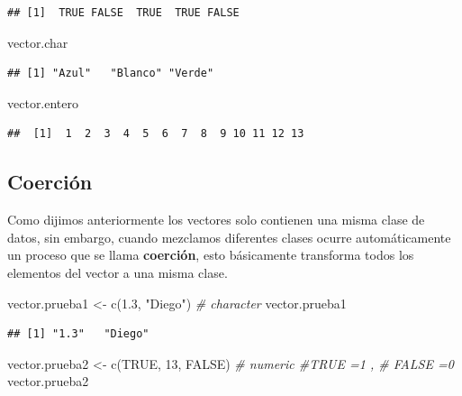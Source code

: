 \documentclass[
  12pt,
]{book}
\newenvironment{Shaded}{\begin{snugshade}}{\end{snugshade}}
\newcommand{\CommentTok}[1]{\textcolor[rgb]{0.56,0.35,0.01}{\textit{#1}}}
\newcommand{\ConstantTok}[1]{\textcolor[rgb]{0.00,0.00,0.00}{#1}}
\newcommand{\DecValTok}[1]{\textcolor[rgb]{0.00,0.00,0.81}{#1}}
\newcommand{\FloatTok}[1]{\textcolor[rgb]{0.00,0.00,0.81}{#1}}
\newcommand{\FunctionTok}[1]{\textcolor[rgb]{0.00,0.00,0.00}{#1}}
\newcommand{\NormalTok}[1]{#1}
\newcommand{\OtherTok}[1]{\textcolor[rgb]{0.56,0.35,0.01}{#1}}
\newcommand{\StringTok}[1]{\textcolor[rgb]{0.31,0.60,0.02}{#1}}
\begin{document}
\begin{verbatim}
## [1]  TRUE FALSE  TRUE  TRUE FALSE
\end{verbatim}

\begin{Shaded}
\begin{Highlighting}[]
\NormalTok{vector.char}
\end{Highlighting}
\end{Shaded}

\begin{verbatim}
## [1] "Azul"   "Blanco" "Verde"
\end{verbatim}

\begin{Shaded}
\begin{Highlighting}[]
\NormalTok{vector.entero}
\end{Highlighting}
\end{Shaded}

\begin{verbatim}
##  [1]  1  2  3  4  5  6  7  8  9 10 11 12 13
\end{verbatim}

\hypertarget{coerciuxf3n}{%
\subsection{\texorpdfstring{\textbf{Coerción}}{Coerción}}\label{coerciuxf3n}}

Como dijimos anteriormente los vectores solo contienen una misma clase de datos, sin embargo, cuando mezclamos diferentes clases ocurre automáticamente un proceso que se llama \textbf{coerción}, esto básicamente transforma todos los elementos del vector a una misma clase.

\begin{Shaded}
\begin{Highlighting}[]
\NormalTok{vector.prueba1 }\OtherTok{\textless{}{-}} \FunctionTok{c}\NormalTok{(}\FloatTok{1.3}\NormalTok{, }\StringTok{"Diego"}\NormalTok{) }\CommentTok{\# character}
\NormalTok{vector.prueba1}
\end{Highlighting}
\end{Shaded}

\begin{verbatim}
## [1] "1.3"   "Diego"
\end{verbatim}

\begin{Shaded}
\begin{Highlighting}[]
\NormalTok{vector.prueba2 }\OtherTok{\textless{}{-}} \FunctionTok{c}\NormalTok{(}\ConstantTok{TRUE}\NormalTok{, }\DecValTok{13}\NormalTok{, }\ConstantTok{FALSE}\NormalTok{) }\CommentTok{\# numeric  \#TRUE =1 , \# FALSE =0}
\NormalTok{vector.prueba2}
\end{Highlighting}
\end{Shaded}
\end{document}
